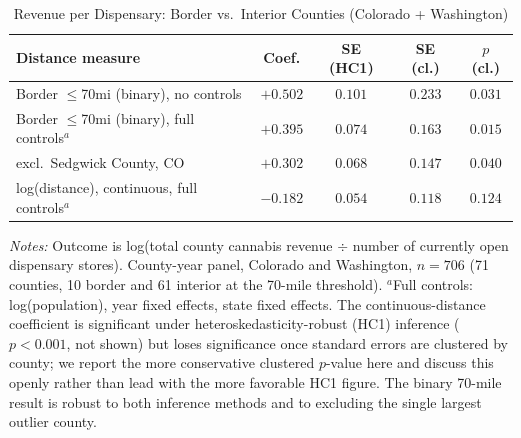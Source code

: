 \begin{table}[htbp]
\centering
\caption{Revenue per Dispensary: Border vs.\ Interior Counties (Colorado + Washington)}
\label{tab:a8_revenue_border}
\small
\begin{tabular}{p{5.6cm}cccc}
\toprule
Distance measure & Coef. & SE (HC1) & SE (cl.) & $p$ (cl.) \\
\midrule
Border $\le$70mi (binary), no controls & $+0.502$ & $0.101$ & $0.233$ & $0.031$ \\
Border $\le$70mi (binary), full controls$^{a}$ & $+0.395$ & $0.074$ & $0.163$ & $0.015$ \\
\quad excl.\ Sedgwick County, CO & $+0.302$ & $0.068$ & $0.147$ & $0.040$ \\
\midrule
log(distance), continuous, full controls$^{a}$ & $-0.182$ & $0.054$ & $0.118$ & $0.124$ \\
\bottomrule
\end{tabular}
\begin{minipage}{0.95\textwidth}
\vspace{0.3em}
\footnotesize
\textit{Notes:} Outcome is log(total county cannabis revenue $\div$ number of currently open dispensary
stores). County-year panel, Colorado and Washington, $n=706$ (71 counties, 10 border and 61 interior at the
70-mile threshold). $^{a}$Full controls: log(population), year fixed effects, state fixed effects. The
continuous-distance coefficient is significant under heteroskedasticity-robust (HC1) inference
($p<0.001$, not shown) but loses significance once standard errors are clustered by county; we report the
more conservative clustered $p$-value here and discuss this openly rather than lead with the more favorable
HC1 figure. The binary 70-mile result is robust to both inference methods and to excluding the single
largest outlier county.
\end{minipage}
\end{table}
